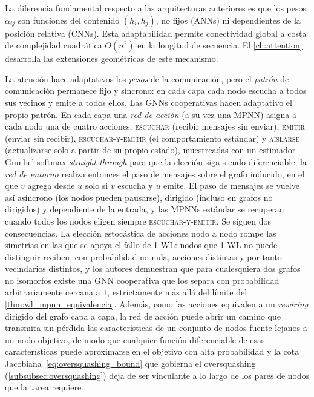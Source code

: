 La diferencia fundamental respecto a las arquitecturas anteriores es que los pesos $\alpha_{ij}$ son funciones del contenido $(h_i, h_j)$, no fijos (\glspl{ANN}) ni dependientes de la posición relativa (\glspl{CNN}). Esta adaptabilidad permite conectividad global a costa de complejidad cuadrática $O(n^2)$ en la longitud de secuencia. El \autoref{ch:attention} desarrolla las extensiones geométricas de este mecanismo.

La atención hace adaptativos los \textit{pesos} de la comunicación, pero el \textit{patrón} de comunicación permanece fijo y síncrono: en cada capa cada nodo escucha a todos sus vecinos y emite a todos ellos. Las \glspl{GNN} cooperativas \citep{finkelshtein2024cognn} hacen adaptativo el propio patrón. En cada capa una \textit{red de acción} (a su vez una \gls{MPNN}) asigna a cada nodo una de cuatro acciones, \textsc{escuchar} (recibir mensajes sin enviar), \textsc{emitir} (enviar sin recibir), \textsc{escuchar-y-emitir} (el comportamiento estándar) y \textsc{aislarse} (actualizarse solo a partir de su propio estado), muestreadas con un estimador Gumbel-softmax \textit{straight-through} para que la elección siga siendo diferenciable; la \textit{red de entorno} realiza entonces el paso de mensajes sobre el grafo inducido, en el que $v$ agrega desde $u$ solo si $v$ escucha y $u$ emite. El paso de mensajes se vuelve así asíncrono (los nodos pueden pausarse), dirigido (incluso en grafos no dirigidos) y dependiente de la entrada, y las \glspl{MPNN} estándar se recuperan cuando todos los nodos eligen siempre \textsc{escuchar-y-emitir}. Se siguen dos consecuencias. La elección estocástica de acciones nodo a nodo rompe las simetrías en las que se apoya el fallo de 1-WL: nodos que 1-WL no puede distinguir reciben, con probabilidad no nula, acciones distintas y por tanto vecindarios distintos, y los autores demuestran que para cualesquiera dos grafos no isomorfos existe una \gls{GNN} cooperativa que los separa con probabilidad arbitrariamente cercana a $1$, estrictamente más allá del límite del \autoref{thm:wl_mpnn_equivalencia}. Además, como las acciones equivalen a un \textit{rewiring} dirigido del grafo capa a capa, la red de acción puede abrir un camino que transmita sin pérdida las características de un conjunto de nodos fuente lejanos a un nodo objetivo, de modo que cualquier función diferenciable de esas características puede aproximarse en el objetivo con alta probabilidad y la cota Jacobiana~\eqref{eq:oversquashing_bound} que gobierna el \gls{oversquashing} (\autoref{subsubsec:oversquashing}) deja de ser vinculante a lo largo de los pares de nodos que la tarea requiere.

